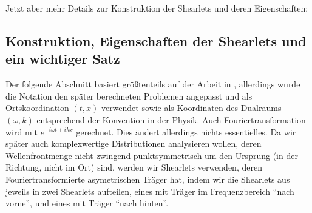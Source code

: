 Jetzt aber mehr Details zur Konstruktion der Shearlets und deren Eigenschaften:


\subsection{Konstruktion, Eigenschaften der Shearlets und ein wichtiger Satz} %
\label{sec:konstruktion_und_eigenschaften_der_shearlets}

Der folgende Abschnitt basiert größtenteils auf der Arbeit in \textcite{Kutyniok2008}, allerdings wurde die Notation den später berechneten Problemen angepasst und als Ortskoordination $(t,x)$ verwendet sowie als Koordinaten des Dualraums $(\omega, k)$ entsprechend der Konvention in der Physik. Auch Fouriertransformation wird mit $e^{-i\omega t + ikx}$ gerechnet. Dies ändert allerdings nichts essentielles. Da wir später auch komplexwertige Distributionen analysieren wollen, deren Wellenfrontmenge nicht zwingend punktsymmetrisch um den Ursprung (in der Richtung, nicht im Ort) sind, werden wir Shearlets verwenden, deren Fouriertransformierte asymetrischen Träger hat, indem wir die Shearlets aus \cite{Kutyniok2008} jeweils in zwei Shearlets aufteilen, eines mit Träger im Frequenzbereich "`nach vorne"', und eines mit Träger "`nach hinten"'. 

